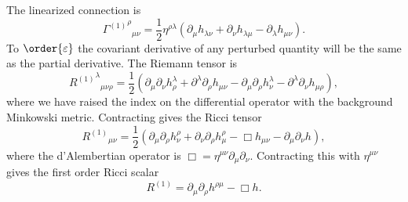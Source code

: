 \documentclass[aps,prd,reprint,showpacs]{revtex4-1}
\begin{document}
The linearized connection is
\begin{equation}
{{\Gamma^{(1)}}^\rho}_{\mu\nu} = \frac{1}{2}\eta^{\rho\lambda}(\partial_\mu h_{\lambda\nu} + \partial_\nu h_{\lambda\mu} - \partial_\lambda h_{\mu\nu}).
\label{eq:Lin_Gamma}
\end{equation}
To $\order{\varepsilon}$ the covariant derivative of any perturbed quantity will be the same as the partial derivative. The Riemann tensor is
\begin{equation}
{{R^{(1)}}^\lambda}_{\mu\nu\rho} = \frac{1}{2}(\partial_\mu\partial_\nu h^\lambda_\rho + \partial^\lambda\partial_\rho h_{\mu\nu} - \partial_\mu\partial_\rho h^\lambda_\nu - \partial^\lambda\partial_\nu h_{\mu\rho}),
\label{eq:Lin_Riemann}
\end{equation}
where we have raised the index on the differential operator with the background Minkowski metric. Contracting gives the Ricci tensor
\begin{equation}
{R^{(1)}}_{\mu\nu} = \frac{1}{2}(\partial_\mu\partial_\rho h^\rho_\nu + \partial_\nu\partial_\rho h^\rho_\mu -\Box h_{\mu\nu} - \partial_\mu\partial_\nu h),
\label{eq:Ricci}
\end{equation}
where the d'Alembertian operator is $\Box = \eta^{\mu\nu}\partial_\mu\partial_\nu$. Contracting this with $\eta^{\mu\nu}$ gives the first order Ricci scalar
\begin{equation}
R^{(1)} = \partial_\mu\partial_\rho h^{\rho\mu} - \Box h.
\label{eq:Scalar}
\end{equation}
\end{document}

